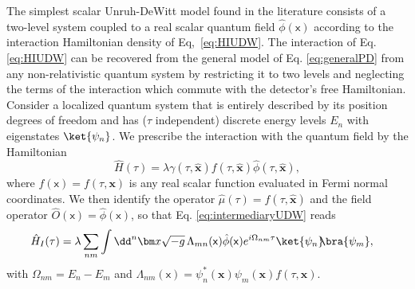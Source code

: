 \documentclass[letterpaper,12pt,titlepage,oneside,final]{book}
\newcommand{\mf}{\mathsf}%
\begin{document}
The simplest scalar Unruh-DeWitt model found in the literature consists of a two-level system coupled to a real scalar quantum field $\hat{\phi}(\mf x)$ according to the interaction Hamiltonian density of Eq,~\eqref{eq:HIUDW}.
The interaction of Eq. \eqref{eq:HIUDW} can be recovered from the general model of Eq. \eqref{eq:generalPD} from any non-relativistic quantum system by restricting it to two levels and neglecting the terms of the interaction which commute with the detector's free Hamiltonian. Consider a localized quantum system that is entirely described by its position degrees of freedom and has ($\tau$ independent) discrete energy levels $E_n$ with eigenstates $\ket{\psi_n}$. We prescribe the interaction with the quantum field by the Hamiltonian
\begin{equation}\label{eq:intermediaryUDW}
    \hat{H}(\tau) = \lambda\gamma(\tau,\hat{\bm x}) f(\tau,\hat{\bm x}) \hat{\phi}(\tau,\hat{\bm x}),
\end{equation}
where $f(\mf x) = f(\tau,{\bm x})$ is any real scalar function evaluated in Fermi normal coordinates. We then identify the operator $\hat{\mu}(\tau) = f(\tau,\hat{\bm x})$ and the field operator \mbox{$\hat{O}(\mf x) = \hat{\phi}(\mf x)$}, so that Eq. \eqref{eq:intermediaryUDW} reads
\begin{align}
    \hat{H}_I(\tau) &= \lambda \sum_{nm}\int \dd^n \bm x \sqrt{-g}\,\Lambda_{mn}(\mf x) \hat{\phi}(\mf x)e^{i\Omega_{nm}\tau}\ket{\psi_n}\!\!\bra{\psi_m},
\end{align}
with $\Omega_{nm} = E_n - E_m$ and $\Lambda_{nm}(\mf x) = \psi_n^*(\bm x)\psi_m(\bm x) f(\tau,\bm x)$.
\end{document}
